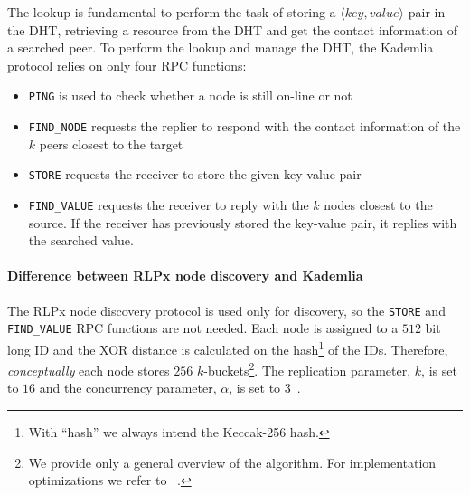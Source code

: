 The lookup is fundamental to perform the task of storing a $\langle key,
value\rangle$ pair in the DHT, retrieving a resource from the DHT and get the
contact information of a searched peer. To perform the lookup and manage the
DHT, the Kademlia protocol relies on only four RPC functions:
\begin{itemize}
    \item \verb|PING| is used to check whether a node is still on-line or not
    \item \verb|FIND_NODE| requests the replier to respond with the contact
    information of the $k$ peers closest to the target
    \item \verb|STORE| requests the receiver to store the given key-value pair
    \item \verb|FIND_VALUE| requests the receiver to reply with the $k$ nodes
    closest to the source. If the receiver has previously stored the key-value
    pair, it replies with the searched value.
\end{itemize}


\paragraph{Difference between RLPx node discovery and Kademlia}
\label{sec:rlpx-discovery}
The RLPx node discovery protocol is used only for discovery, so the \verb|STORE|
and \verb|FIND_VALUE| RPC functions are not needed. Each node is assigned to a
$512$ bit long ID and the XOR distance is calculated on the hash\footnote{With
``hash'' we always intend the Keccak-256 hash.} of the IDs. Therefore,
\emph{conceptually} each node stores $256$ $k$-buckets\footnote{We provide only
a general overview of the algorithm. For implementation optimizations we refer
to ~\cite{bib:kademlia}.}. The replication parameter, $k$, is set to $16$ and
the concurrency parameter, $\alpha$, is set to
$3$~\cite{bib:rlpx-discovery-protocol}.

